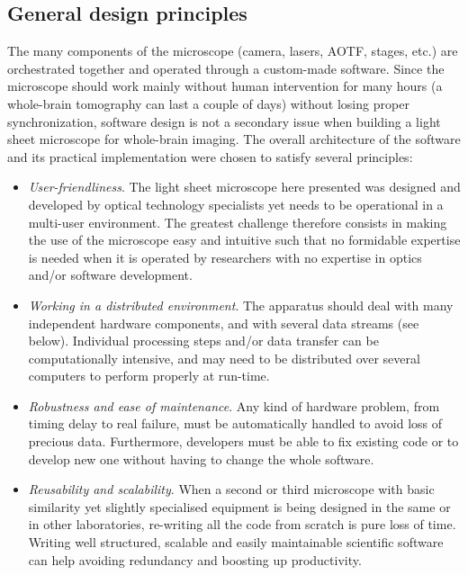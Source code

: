\documentclass[12pt]{spieman}  %
\begin{document}




\subsection{General design principles}

The many components of the microscope (camera, lasers, AOTF, stages, etc.) are orchestrated together and operated through a custom-made software. Since the microscope should work mainly without human intervention for many hours (a whole-brain tomography can last a couple of days) without losing proper synchronization, software design is not a secondary issue when building a light sheet microscope for whole-brain imaging. The overall architecture of the software and its practical implementation were chosen to satisfy several principles:

\begin{itemize}
\item{\emph{User-friendliness}. The light sheet microscope here presented was designed and developed by optical technology specialists yet needs to be operational in a multi-user environment. The greatest challenge therefore consists in making the use of the microscope easy and intuitive such that no formidable expertise is needed when it is operated by researchers with no expertise in optics and/or software development.}
\item{\emph{Working in a distributed environment}. The apparatus should deal with many independent hardware components, and with several data streams (see below). Individual processing steps and/or data transfer can be computationally intensive, and may need to be distributed over several computers to perform properly at run-time.}
\item{\emph{Robustness and ease of maintenance}. Any kind of hardware problem, from timing delay to real failure, must be automatically handled to avoid loss of precious data. Furthermore, developers must be able to fix existing code or to develop new one without having to change the whole software.}
\item{\emph{Reusability and scalability}. When a second or third microscope with basic similarity yet slightly specialised equipment is being designed in the same or in other laboratories, re-writing all the code from scratch is pure loss of time. Writing well structured, scalable and easily maintainable scientific software can help avoiding redundancy and boosting up productivity.}
\end{itemize}
\end{document}
